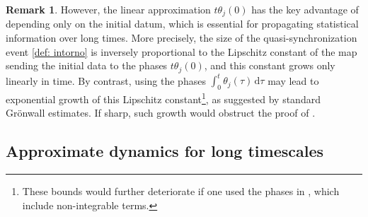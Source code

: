 \documentclass[a4paper,10pt,reqno]{article}
\theoremstyle{definition}
\theoremstyle{plain}
\newtheorem{theorem}[definition]{Theorem}
\theoremstyle{plain}
\theoremstyle{definition}
\theoremstyle{plain}
\theoremstyle{plain}
\theoremstyle{plain}
\theoremstyle{definition}
\newtheorem{rem}[definition]{Remark}
\theoremstyle{definition}
\newcommand{\norm}[1]{\left\lVert #1 \right\rVert}
\begin{document}
\begin{rem}
However, the linear approximation \(t\theta_j(0)\) has the key advantage of depending only on the initial datum, which is essential for propagating statistical information over long times. More precisely, the size of the quasi-synchronization event \eqref{def: intorno} is inversely proportional to the Lipschitz constant of the map sending the initial data to the phases \(t\theta_j(0)\), and this constant grows only linearly in time. By contrast, using the phases \(\int_0^t \theta_j(\tau)\,\mathrm{d}\tau\) may lead to exponential growth of this Lipschitz constant\footnote{These bounds would further deteriorate if one used the phases in \cite[Section~7.1.3]{bernier}, which include non-integrable terms.}, as suggested by standard Gr\"onwall estimates. If sharp, such growth would obstruct the proof of .
\end{rem}

\subsection{Approximate dynamics for long timescales} \label{subsection: proof of thm dynamics}


\end{document}
